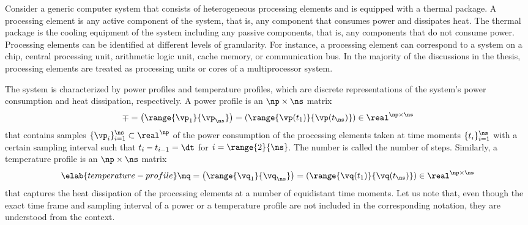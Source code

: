 Consider a generic computer system that consists of \np heterogeneous processing
elements and is equipped with a thermal package. A processing element is any
active component of the system, that is, any component that consumes power and
dissipates heat. The thermal package is the cooling equipment of the system
including any passive components, that is, any components that do not consume
power. Processing elements can be identified at different levels of granularity.
For instance, a processing element can correspond to a system on a chip, central
processing unit, arithmetic logic unit, cache memory, or communication bus. In
the majority of the discussions in the thesis, processing elements are treated
as processing units or cores of a multiprocessor system.

The system is characterized by power profiles and temperature profiles, which
are discrete representations of the system's power consumption and heat
dissipation, respectively. A power profile is an $\np \times \ns$ matrix
\[
  \mp
  = \left(\range{\vp_1}{\vp_\ns}\right)
  = \left(\range{\vp(t_1)}{\vp(t_\ns)}\right) \in \real^{\np \times \ns}
\]
that contains \ns samples $\{ \vp_i \}_{i = 1}^\ns \subset \real^\np$ of the
power consumption of the \np processing elements taken at \ns time moments $\{
t_i \}_{i = 1}^\ns$ with a certain sampling interval \dt such that $t_i - t_{i -
1} = \dt$ for $i = \range{2}{\ns}$. The number \ns is called the number of
steps. Similarly, a temperature profile is an $\np \times \ns$ matrix
\begin{equation} \elab{temperature-profile}
  \mq
  = \left(\range{\vq_1}{\vq_\ns}\right)
  = \left(\range{\vq(t_1)}{\vq(t_\ns)}\right) \in \real^{\np \times \ns}
\end{equation}
that captures the heat dissipation of the processing elements at a number of
equidistant time moments. Let us note that, even though the exact time frame and
sampling interval of a power or a temperature profile are not included in the
corresponding notation, they are understood from the context.
